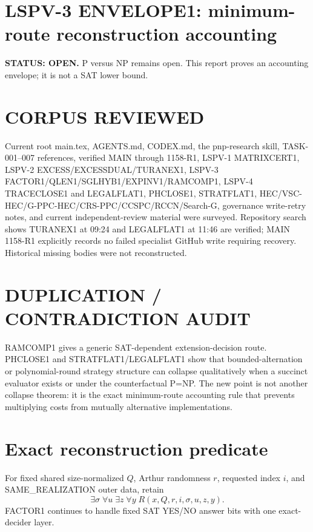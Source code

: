 \documentclass[11pt]{article}
\begin{document}
\section*{LSPV-3 ENVELOPE1: minimum-route reconstruction accounting}
\textbf{STATUS: OPEN.} P versus NP remains open. This report proves an accounting envelope; it is not a SAT lower bound.
\section*{CORPUS REVIEWED}
Current root main.tex, AGENTS.md, CODEX.md, the pnp-research skill, TASK-001--007 references, verified MAIN through 1158-R1, LSPV-1 MATRIXCERT1, LSPV-2 EXCESS/EXCESSDUAL/TURANEX1, LSPV-3 FACTOR1/QLEN1/SGLHYB1/EXPINV1/RAMCOMP1, LSPV-4 TRACECLOSE1 and LEGALFLAT1, PHCLOSE1, STRATFLAT1, HEC/VSC-HEC/G-PPC-HEC/CRS-PPC/CCSPC/RCCN/Search-G, governance write-retry notes, and current independent-review material were surveyed. Repository search shows TURANEX1 at 09:24 and LEGALFLAT1 at 11:46 are verified; MAIN 1158-R1 explicitly records no failed specialist GitHub write requiring recovery. Historical missing bodies were not reconstructed.
\section*{DUPLICATION / CONTRADICTION AUDIT}
RAMCOMP1 gives a generic SAT-dependent extension-decision route. PHCLOSE1 and STRATFLAT1/LEGALFLAT1 show that bounded-alternation or polynomial-round strategy structure can collapse qualitatively when a succinct evaluator exists or under the counterfactual P=NP. The new point is not another collapse theorem: it is the exact minimum-route accounting rule that prevents multiplying costs from mutually alternative implementations.
\section*{Exact reconstruction predicate}
For fixed shared size-normalized $Q$, Arthur randomness $r$, requested index $i$, and SAME\_REALIZATION outer data, retain
\[
\exists\sigma\;\forall u\;\exists z\;\forall y\;R(x,Q,r,i,\sigma,u,z,y).
\]
FACTOR1 continues to handle fixed SAT YES/NO answer bits with one exact-decider layer.
\end{document}
